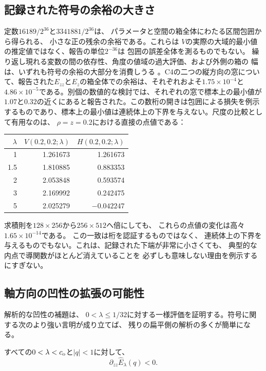 \subsection{記録された符号の余裕の大きさ}

定数$16189/2^{36}$と$3341881/2^{36}$は、
パラメータと空間の箱全体にわたる区間包囲から得られる、
小さな正の残余の余裕である。これらは
$V$の実際の大域的最小値の推定値ではなく、報告の単位$2^{-36}$は
包囲の誤差全体を測るものでもない。
繰り返し現れる変数の間の依存性、角度の値域の過大評価、および外側の箱の
幅は、いずれも符号の余裕の大部分を消費しうる
\citep{Rump2010}。C4の二つの縦方向の窓について、報告された$E_{zz}$と$E_z$の箱全体での余裕は、それぞれおよそ$1.75\times10^{-4}$と$4.86\times10^{-5}$である。別個の数値的な検討では、それぞれの窓で標本上の最小値が$1.07$と$0.32$の近くにあると報告された。この数桁の開きは包囲による損失を例示するものであり、標本上の最小値は連続体上の下界を与えない。尺度の比較として有用なのは、
$\rho=z=0.2$における直接の点値である：
\begin{center}
\begin{tabular}{rrr}
\toprule
$\lambda$&$V(0.2,0.2;\lambda)$&$H(0.2,0.2;\lambda)$\\
\midrule
1&1.261673&1.261673\\
1.5&1.810885&0.883353\\
2&2.053848&0.593574\\
3&2.169992&0.242475\\
5&2.025279&$-0.042247$\\
\bottomrule
\end{tabular}
\end{center}
求積則を$128\times256$から$256\times512$へ倍にしても、
これらの点値の変化は高々$1.65\times10^{-14}$である。
この一致は桁を認証するものではなく、
連続体上の下界を与えるものでもない。これは、記録された下端が非常に小さくても、
典型的な内点で導関数がほとんど消えていることを
必ずしも意味しない理由を例示するにすぎない。

\subsection{軸方向の凹性の拡張の可能性}

解析的な凹性の補題は、
$0<\lambda\leq1/32$に対する一様評価を証明する。符号に関する次のより強い言明が成り立てば、
残りの扁平側の解析の多くが簡単になる。

\begin{conjecture}\label{conj:concavity}
すべての$0<\lambda<c_{\mathrm o}$と$|q|<1$に対して、
\[
 \partial_{zz}\widehat E_\lambda(q)<0.
\]
\end{conjecture}

